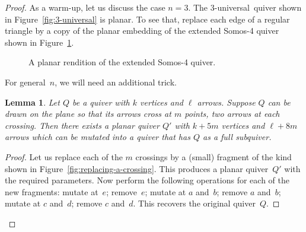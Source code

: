 \documentclass[10pt]{amsart}
\newtheorem{lemma}[theorem]{Lemma}
\theoremstyle{definition}
\begin{document}
\begin{proof}
As a warm-up, let us discuss the case $n=3$. %
The 3-universal~quiver shown in Figure~\ref{fig:3-universal} is planar. 
To see that, replace each edge of a regular triangle by a copy of the planar embedding of the extended Somos-4 quiver shown in Figure~\ref{fig:flattened-Somos-4}.

\begin{figure}[ht]\centering
{}

\caption{A planar rendition of the extended Somos-4 quiver. }
\label{fig:flattened-Somos-4}
\end{figure}


For general~$n$, we will need an additional trick. 

\begin{lemma}
\label{lem:resolving-crossings}
Let $Q$ be a quiver with $k$ vertices and $\ell$ arrows.
Suppose $Q$ can be drawn on the plane so that its arrows cross at $m$ points, two arrows at each crossing. Then there exists a planar quiver $Q'$ with $k+5m$ vertices and $\ell+8m$ arrows which can be mutated into a quiver that has $Q$ as a full subquiver. 
\end{lemma}

\begin{proof}
Let us replace each of the $m$ crossings by a (small) fragment of the kind shown in Figure~\ref{fig:replacing-a-crossing}. 
This produces a planar quiver~$Q'$ with the required parameters. Now perform the following operations for each of the new fragments: 
mutate at~$e$; remove~$e$; 
mutate at $a$ and~$b$; remove $a$ and~$b$;
mutate at $c$ and~$d$; remove $c$ and~$d$. 
This recovers the original quiver~$Q$. 
\end{proof}


\end{proof}
\end{document}
